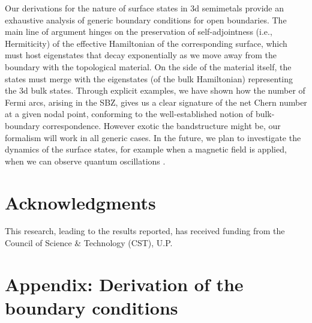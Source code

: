 \documentclass[aps,prb,onecolumn, footinbib, 10pt]{revtex4-2}
\begin{document}
Our derivations for the nature of surface states in 3d semimetals provide an exhaustive analysis of generic boundary conditions for open boundaries. The main line of argument hinges on the preservation of self-adjointness (i.e., Hermiticity) of the effective Hamiltonian of the corresponding surface, which must host eigenstates that decay exponentially as we move away from the boundary with the topological material. On the side of the material itself, the states must merge with the eigenstates (of the bulk Hamiltonian) representing the 3d bulk states. Through explicit examples, we have shown how the number of Fermi arcs, arising in the SBZ, gives us a clear signature of the net Chern number at a given nodal point, conforming to the well-established notion of bulk-boundary correspondence. However exotic the bandstructure might be, our formalism will work in all generic cases. In the future, we plan to investigate the dynamics of the surface states, for example when a magnetic field is applied, when we can observe quantum oscillations \cite{qtm-osc-ashvin, *hosur-arc-osc}.




\section*{Acknowledgments}

This research, leading to the results reported, has received funding from the Council of Science \& Technology (CST), U.P.

\appendix

\section*{Appendix: Derivation of the boundary conditions}
\end{document}
